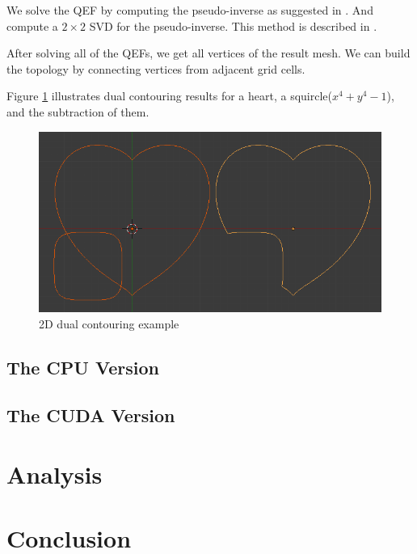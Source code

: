 \documentclass[a4paper,12pt]{article}
\begin{document}
We solve the QEF by computing the pseudo-inverse
as suggested in \cite{ju2002dual}.
And compute a $2\times2$ SVD for the pseudo-inverse.
This method is described in \cite{blinn2003jim}.

After solving all of the QEFs, we get all vertices of the result mesh.
We can build the topology by connecting vertices from
adjacent grid cells.

Figure \ref{fig:2d-dc-example} illustrates dual contouring results
for a heart, a squircle($x^4 + y^4 - 1$),
and the subtraction of them.

\begin{figure}[h]
\centering
\includegraphics[width=0.9 \textwidth]{heart-squircle-subtraction.png}
\caption{2D dual contouring example}
\label{fig:2d-dc-example}
\end{figure}

\subsection{The CPU Version}

\subsection{The CUDA Version}

\section{Analysis}

\section{Conclusion}

\newpage
{}


\end{document}
